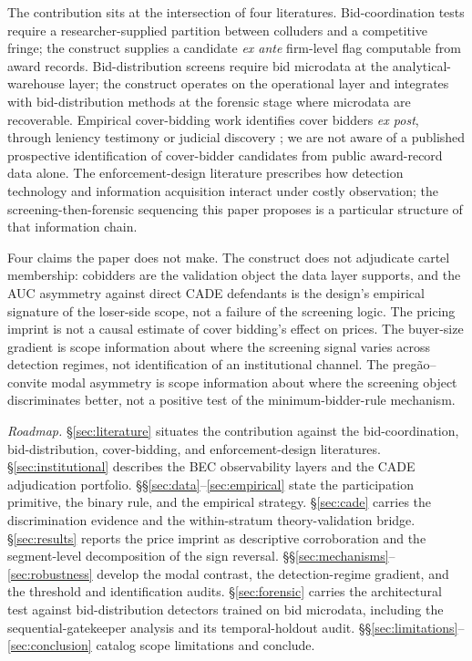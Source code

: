The contribution sits at the intersection of four literatures.
Bid-coordination tests
\citep{bajari2003deciding,porter1993detection,conley2016detecting}
require a researcher-supplied partition between colluders and
a competitive fringe; the construct supplies a candidate
\emph{ex ante} firm-level flag computable from award records.
Bid-distribution screens
\citep{imhof2019detecting,wallimann2023machine,huber2019machine}
require bid microdata at the analytical-warehouse layer; the
construct operates on the operational layer and integrates
with bid-distribution methods at the forensic stage where
microdata are recoverable. Empirical cover-bidding work
identifies cover bidders \emph{ex post}, through leniency
testimony or judicial discovery
\citep{porter1999ohio,pesendorfer2000study,asker2010leniency,kawai2022detecting};
we are not aware of a published prospective identification of
cover-bidder candidates from public award-record data alone.
The enforcement-design literature
\citep{becker1968crime,stigler1970optimum,harrington2008detecting,baker2002case}
prescribes how detection technology and information
acquisition interact under costly observation; the
screening-then-forensic sequencing this paper proposes is a
particular structure of that information chain.

Four claims the paper does not make. The construct does not
adjudicate cartel membership: cobidders are the validation
object the data layer supports, and the AUC asymmetry against
direct CADE defendants is the design's empirical signature of
the loser-side scope, not a failure of the screening logic.
The pricing imprint is not a causal estimate of cover
bidding's effect on prices. The buyer-size gradient is scope
information about where the screening signal varies across
detection regimes, not identification of an institutional
channel. The preg\~ao--convite modal asymmetry is scope
information about where the screening object discriminates
better, not a positive test of the minimum-bidder-rule
mechanism.

\medskip\noindent
\textit{Roadmap.}
\S\ref{sec:literature} situates the contribution against the
bid-coordination, bid-distribution, cover-bidding, and
enforcement-design literatures.
\S\ref{sec:institutional} describes the BEC observability
layers and the CADE adjudication portfolio.
\S\S\ref{sec:data}--\ref{sec:empirical} state the
participation primitive, the binary rule, and the empirical
strategy.
\S\ref{sec:cade} carries the discrimination evidence and the
within-stratum theory-validation bridge.
\S\ref{sec:results} reports the price imprint as descriptive
corroboration and the segment-level decomposition of the sign
reversal.
\S\S\ref{sec:mechanisms}--\ref{sec:robustness} develop the
modal contrast, the detection-regime gradient, and the
threshold and identification audits.
\S\ref{sec:forensic} carries the architectural test against
bid-distribution detectors trained on bid microdata, including
the sequential-gatekeeper analysis and its temporal-holdout
audit. \S\S\ref{sec:limitations}--\ref{sec:conclusion} catalog
scope limitations and conclude.
